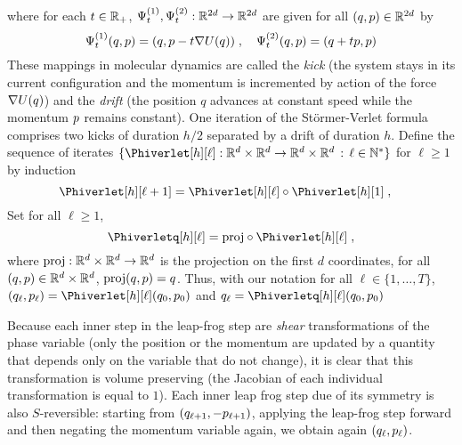 where for each $t \in \mathbb{R}_+$, $\Psi^{(1)}_t, \Psi^{(2)}_t :\mathbb{R}^{2d} \to \mathbb{R}^{2d}$ are given for all $(q,p) \in \mathbb{R}^{2d}$ by
\begin{equation}
  \label{eq:def_Psiverlet_0}
\Psi^{(1)}_t(q,p) = (q, p-t\nabla U(q)) \;, \quad\Psi^{(2)}_t(q,p) = (q+tp, p)
\end{equation}
These mappings in molecular dynamics are called the \emph{kick} (the system stays in its current configuration and the momentum is incremented by action of the force $\nabla U(q)$) and the \emph{drift} (the position $q$ advances at constant speed while the momentum $p$ remains constant). One iteration of the Störmer-Verlet formula comprises two kicks of duration $h/2$ separated by a drift of duration $h$.
Define the sequence of iterates $\{\Phiverlet[h][\ell] : \rset^d \times \rset^d \to \rset^d \times \rset^d \, : \, \ell \in \nset^*\} $ for $\ell \geq 1$ by induction
\begin{equation}
  \label{eq:def_Phiverlet}
\Phiverlet[h][\ell+1] = \Phiverlet[h][\ell] \circ \Phiverlet[h][1] \eqsp, \quad
\end{equation}
Set for all $\ell \geq 1$,  %
\begin{equation}
  \label{eq:def_Phiverletq}
  \Phiverletq[h][\ell] = \projq \circ \Phiverlet[h][\ell] \eqsp,
\end{equation}
where $ \mathrm{proj} : \mathbb{R}^d \times \mathbb{R}^d \to \mathbb{R}^d$ is the projection on the first $d$ coordinates, for all $(q,p) \in \mathbb{R}^d \times \mathbb{R}^d$, $\mathrm{proj}(q,p) = q$.
Thus, with our notation for all $\ell \in \{1,\ldots, T\}$, $ (\q_\ell,\p_\ell) =\Phiverlet[h][\ell](\q_0,\p_0)$ and $ \q_\ell = \Phiverletq[h][\ell](\q_0,\p_0)$

 Because each inner step in the leap-frog step are \emph{shear} transformations of the phase variable (only the position or the momentum are updated by a quantity that depends only on the variable that do not change), it is clear that this transformation is volume preserving (the Jacobian of each individual transformation is equal to $1$). Each inner leap frog step due of its symmetry is also $S$-reversible: starting from $(q_{\ell+1},-p_{\ell+1})$, applying the leap-frog step forward and then negating the momentum variable again, we obtain again $(q_\ell,p_\ell)$.

